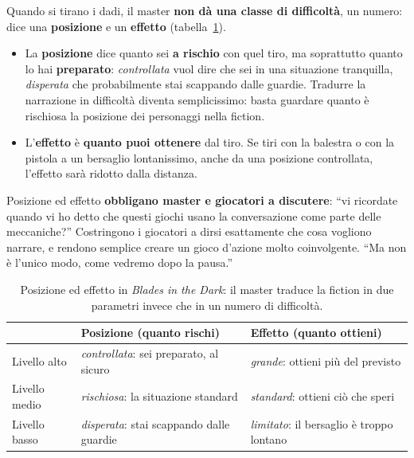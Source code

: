 Quando si tirano i dadi, il master \textbf{non dà una classe di difficoltà}, un numero: dice una
\textbf{posizione} e un \textbf{effetto} (tabella~\ref{a16:tab:posizione}).
\begin{itemize}
  \item La \textbf{posizione} dice quanto sei \textbf{a rischio} con quel tiro, ma soprattutto
        quanto lo hai \textbf{preparato}: \emph{controllata} vuol dire che sei in una situazione
        tranquilla, \emph{disperata} che probabilmente stai scappando dalle guardie. Tradurre la
        narrazione in difficoltà diventa semplicissimo: basta guardare quanto è rischiosa la
        posizione dei personaggi nella fiction.
  \item L'\textbf{effetto} è \textbf{quanto puoi ottenere} dal tiro. Se tiri con la balestra o con
        la pistola a un bersaglio lontanissimo, anche da una posizione controllata, l'effetto sarà
        ridotto dalla distanza.
\end{itemize}
Posizione ed effetto \textbf{obbligano master e giocatori a discutere}: ``vi ricordate quando vi ho
detto che questi giochi usano la conversazione come parte delle meccaniche?'' Costringono i
giocatori a dirsi esattamente che cosa vogliono narrare, e rendono semplice creare un gioco
d'azione molto coinvolgente. ``Ma non è l'unico modo, come vedremo dopo la pausa.''

\begin{table}[htbp]
\centering
\small
\caption{Posizione ed effetto in \emph{Blades in the Dark}: il master traduce la fiction in due
parametri invece che in un numero di difficoltà.}
\label{a16:tab:posizione}
\begin{tabular}{@{}>{\raggedright\arraybackslash}p{2.6cm}>{\raggedright\arraybackslash}p{5.2cm}>{\raggedright\arraybackslash}p{5.4cm}@{}}
\toprule
& \textbf{Posizione} (quanto rischi) & \textbf{Effetto} (quanto ottieni) \\
\midrule
Livello alto & \emph{controllata}: sei preparato, al sicuro & \emph{grande}: ottieni più del
  previsto \\
Livello medio & \emph{rischiosa}: la situazione standard & \emph{standard}: ottieni ciò che
  speri \\
Livello basso & \emph{disperata}: stai scappando dalle guardie & \emph{limitato}: il bersaglio
  è troppo lontano \\
\bottomrule
\end{tabular}
\end{table}

